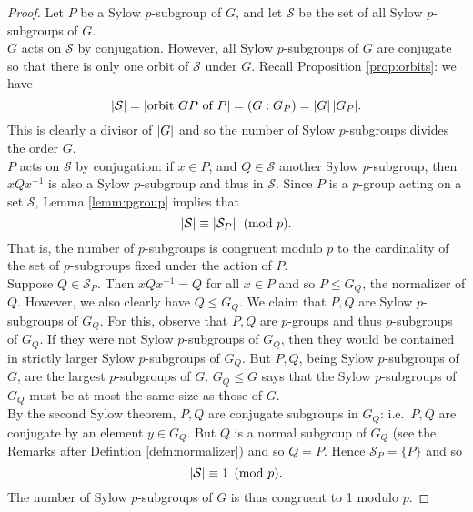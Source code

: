 \begin{proof}
\def\SSS{\mathcal{S}}
Let $P$ be a Sylow $p$-subgroup of $G$, and let $\SSS$ be the set of all Sylow $p$-subgroups of $G$.\\
$G$ acts on $\SSS$ by conjugation. However, all Sylow $p$-subgroups of $G$ are conjugate so that there is only one orbit of $\SSS$ under $G$. Recall Proposition \ref{prop:orbits}: we have
\[\nm{\SSS}=\nm{\text{orbit $GP$ of $P$}}=(G:G_P)=\nm{G}{\nm{G_P}}.\]
This is clearly a divisor of $\left| G\right|$ and so the number of Sylow $p$-subgroups divides the order $G$.\\
$P$ acts on $\SSS$ by conjugation: if $x\in P$, and $Q\in\SSS$ another Sylow $p$-subgroup, then $xQx^{-1}$ is also a Sylow $p$-subgroup and thus in $\SSS$. Since $P$ is a $p$-group acting on a set $\SSS$, Lemma \ref{lemm:pgroup} implies that
\[\nm{\SSS}\equiv\nm{\SSS_P}\pmod p.\]
That is, the number of $p$-subgroups is congruent modulo $p$ to the cardinality of the set of $p$-subgroups fixed under the action of $P$.\\
Suppose $Q\in \SSS_P$. Then $xQx^{-1}=Q$ for all $x\in P$ and so $P\le G_Q$, the normalizer of $Q$. However, we also clearly have $Q\le G_Q$. We claim that $P,Q$ are Sylow $p$-subgroups of $G_Q$. For this, observe that $P,Q$ are $p$-groups and thus $p$-subgroups of $G_Q$. If they were not Sylow $p$-subgroups of $G_Q$, then they would be contained in strictly larger Sylow $p$-subgroups of $G_Q$. But $P,Q$, being Sylow $p$-subgroups of $G$, are the largest $p$-subgroups of $G$. $G_Q\le G$ says that the Sylow $p$-subgroups of $G_Q$ must be at most the same size as those of $G$.\\
By the second Sylow theorem, $P,Q$ are conjugate subgroups in $G_Q$: i.e.~$P,Q$ are conjugate by an element $y\in G_Q$. But $Q$ is a normal subgroup of $G_Q$ (see the Remarks after Defintion \ref{defn:normalizer}) and so $Q=P$. Hence $\SSS_P=\{P\}$ and so
\[\nm{\SSS}\equiv 1\pmod p.\]
The number of Sylow $p$-subgroups of $G$ is thus congruent to 1 modulo $p$.
\end{proof}


